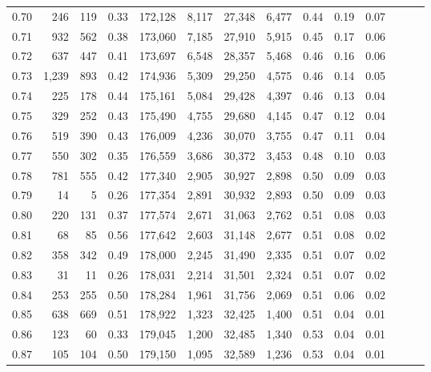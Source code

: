 \begin{tabular}{rrrrrrrrrrrrrr}
0.70 &     246 &    119 &  0.33 &  172,128 &    8,117 &  27,348 &   6,477 &  0.44 &  0.19 &      0.07 \\
0.71 &     932 &    562 &  0.38 &  173,060 &    7,185 &  27,910 &   5,915 &  0.45 &  0.17 &      0.06 \\
0.72 &     637 &    447 &  0.41 &  173,697 &    6,548 &  28,357 &   5,468 &  0.46 &  0.16 &      0.06 \\
0.73 &   1,239 &    893 &  0.42 &  174,936 &    5,309 &  29,250 &   4,575 &  0.46 &  0.14 &      0.05 \\
0.74 &     225 &    178 &  0.44 &  175,161 &    5,084 &  29,428 &   4,397 &  0.46 &  0.13 &      0.04 \\
0.75 &     329 &    252 &  0.43 &  175,490 &    4,755 &  29,680 &   4,145 &  0.47 &  0.12 &      0.04 \\
0.76 &     519 &    390 &  0.43 &  176,009 &    4,236 &  30,070 &   3,755 &  0.47 &  0.11 &      0.04 \\
0.77 &     550 &    302 &  0.35 &  176,559 &    3,686 &  30,372 &   3,453 &  0.48 &  0.10 &      0.03 \\
0.78 &     781 &    555 &  0.42 &  177,340 &    2,905 &  30,927 &   2,898 &  0.50 &  0.09 &      0.03 \\
0.79 &      14 &      5 &  0.26 &  177,354 &    2,891 &  30,932 &   2,893 &  0.50 &  0.09 &      0.03 \\
0.80 &     220 &    131 &  0.37 &  177,574 &    2,671 &  31,063 &   2,762 &  0.51 &  0.08 &      0.03 \\
0.81 &      68 &     85 &  0.56 &  177,642 &    2,603 &  31,148 &   2,677 &  0.51 &  0.08 &      0.02 \\
0.82 &     358 &    342 &  0.49 &  178,000 &    2,245 &  31,490 &   2,335 &  0.51 &  0.07 &      0.02 \\
0.83 &      31 &     11 &  0.26 &  178,031 &    2,214 &  31,501 &   2,324 &  0.51 &  0.07 &      0.02 \\
0.84 &     253 &    255 &  0.50 &  178,284 &    1,961 &  31,756 &   2,069 &  0.51 &  0.06 &      0.02 \\
0.85 &     638 &    669 &  0.51 &  178,922 &    1,323 &  32,425 &   1,400 &  0.51 &  0.04 &      0.01 \\
0.86 &     123 &     60 &  0.33 &  179,045 &    1,200 &  32,485 &   1,340 &  0.53 &  0.04 &      0.01 \\
0.87 &     105 &    104 &  0.50 &  179,150 &    1,095 &  32,589 &   1,236 &  0.53 &  0.04 &      0.01 \\

\end{tabular}
